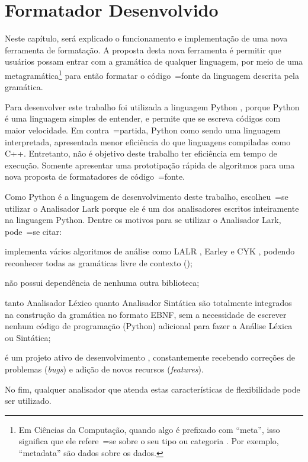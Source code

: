

\chapter{Formatador Desenvolvido}
\label{software_implementation}

Neste capítulo,
será explicado o funcionamento e
implementação de uma nova ferramenta de formatação.
A proposta desta nova ferramenta é permitir que usuários possam entrar com a gramática de qualquer linguagem,
por meio de uma metagramática\footnote{
Em Ciências da Computação,
quando algo é prefixado com ``meta'',
isso significa que ele refere~=se sobre o seu tipo ou
categoria \cite{theUseOfMetaRules}.
Por exemplo,
``metadata'' são dados sobre os dados.
} para então formatar o código~=fonte da linguagem descrita pela gramática.

Para desenvolver este trabalho foi utilizada a linguagem Python \cite{webDevelopmentWithDjango},
porque Python é uma linguagem simples de entender,
e permite que se escreva códigos com maior velocidade.
Em contra~=partida,
Python como sendo uma linguagem interpretada,
apresentada menor eficiência do que linguagens compiladas como C++.
Entretanto,
não é objetivo deste trabalho ter eficiência em tempo de execução.
Somente apresentar uma prototipação rápida de algoritmos para uma nova proposta de formatadores de código~=fonte.

Como Python é a linguagem de desenvolvimento deste trabalho,
escolheu~=se utilizar o Analisador Lark porque ele é um dos analisadores escritos inteiramente na linguagem Python.
Dentre os motivos para se utilizar o Analisador Lark,
pode~=se citar:
\begin{inparaenum}[1)]
\item implementa vários algoritmos de análise como LALR \cite{lalrDeRemer1982},
Earley \cite{JayEarley} e CYK \cite{hopcroftBook},
podendo reconhecer todas as gramáticas livre de contexto ();
\item não possui dependência de nenhuma outra biblioteca;
\item tanto Analisador Léxico quanto Analisador Sintática são totalmente integrados na construção da gramática no formato EBNF,
sem a necessidade de escrever nenhum código de programação (Python) adicional para fazer a Análise Léxica ou
Sintática;
\item é um projeto ativo de desenvolvimento \cite{larkCommitHistory},
constantemente recebendo correções de problemas (\textit{bugs}) e
adição de novos recursos (\textit{features}).
\end{inparaenum}%
No fim,
qualquer analisador que atenda estas características de flexibilidade pode ser utilizado.

